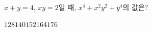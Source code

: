 $x+y=4$, $xy=2$일 때, $x^4+x^2y^2+y^4$의 값은?
\begin{choices32}{$128$}{$140$}{$152$}{$164$}{$176$}\end{choices32}
